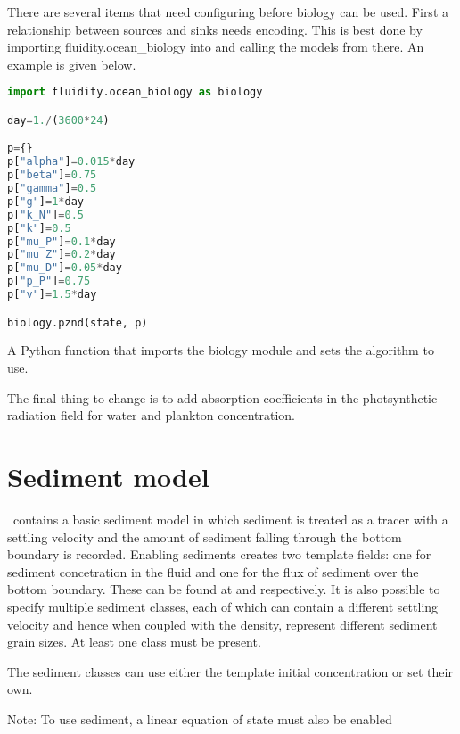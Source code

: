 There are several items that need configuring before biology can be used.
First a relationship between sources and sinks needs encoding. This is best
done by importing fluidity.ocean\_biology into
 and calling the
models from there. An example is given below.

\begin{example}
  \begin{lstlisting}[language=Python]
import fluidity.ocean_biology as biology

day=1./(3600*24)

p={}
p["alpha"]=0.015*day
p["beta"]=0.75
p["gamma"]=0.5
p["g"]=1*day
p["k_N"]=0.5
p["k"]=0.5
p["mu_P"]=0.1*day
p["mu_Z"]=0.2*day
p["mu_D"]=0.05*day
p["p_P"]=0.75
p["v"]=1.5*day

biology.pznd(state, p)  
  \end{lstlisting}
  \caption{A Python function that imports the biology module and sets the algorithm to use.}
\end{example}

The final thing to change is to add absorption coefficients in the photsynthetic radiation field for water and plankton concentration.

\section{Sediment model}
\label{config:sediments}

\fluidity\ contains a basic sediment model in which sediment is treated as a
tracer with a settling velocity and the amount of sediment falling through
the bottom boundary is recorded. Enabling sediments creates two template
fields: one for sediment concetration in the fluid and one for the flux of
sediment over the bottom boundary. These can be found at
 and
 respectively.
It is also possible to specify multiple sediment classes, each of which can
contain a different settling velocity and hence when coupled with the
density, represent different sediment grain sizes. At least one class must
be present.

The sediment classes can use either the template initial concentration or set their own.

Note: To use sediment, a linear equation of state must also be enabled 

